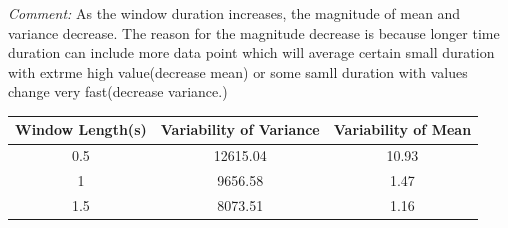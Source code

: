 \documentclass[8pt]{article}  %
\theoremstyle{plain}
\theoremstyle{definition}
\theoremstyle{remark}
\begin{document}
    \begin{minipage}{0.5\textwidth}  
        \centering
        \textit{Comment:} 
        As the window duration increases, the magnitude of mean and variance decrease.
        The reason for the magnitude decrease is because longer time duration can include more data point
        which will average certain small duration with extrme high value(decrease mean) or some samll duration 
        with values change very fast(decrease variance.)
        
    \end{minipage}
    \hfill  
    \begin{minipage}{0.48\textwidth}  
        \centering  
        \begin{tabular}{|c|c|c|}  %
        \hline
        Window Length(s)& Variability of Variance & Variability of Mean  \\
        \hline
        0.5 & 12615.04  & 10.93 \\
        1 & 9656.58  & 1.47  \\
        1.5 & 8073.51  & 1.16 \\
        \hline
        \end{tabular}
    \end{minipage}
    
\end{document}
